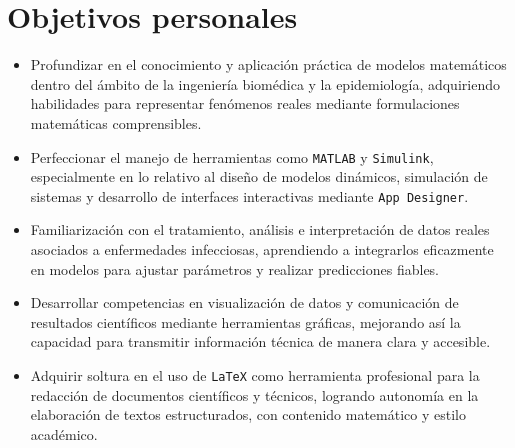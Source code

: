 \section{Objetivos personales}
\begin{itemize}
\item Profundizar en el conocimiento y aplicación práctica de modelos matemáticos dentro del ámbito de la ingeniería biomédica y la epidemiología, adquiriendo habilidades para representar fenómenos reales mediante formulaciones matemáticas comprensibles.
\item Perfeccionar el manejo de herramientas como \texttt{MATLAB} y \texttt{Simulink}, especialmente en lo relativo al diseño de modelos dinámicos, simulación de sistemas y desarrollo de interfaces interactivas mediante \texttt{App Designer}.
\item Familiarización con el tratamiento, análisis e interpretación de datos reales asociados a enfermedades infecciosas, aprendiendo a integrarlos eficazmente en modelos para ajustar parámetros y realizar predicciones fiables.
\item Desarrollar competencias en visualización de datos y comunicación de resultados científicos mediante herramientas gráficas, mejorando así la capacidad para transmitir información técnica de manera clara y accesible.
\item Adquirir soltura en el uso de \texttt{LaTeX} como herramienta profesional para la redacción de documentos científicos y técnicos, logrando autonomía en la elaboración de textos estructurados, con contenido matemático y estilo académico.
\end{itemize}

